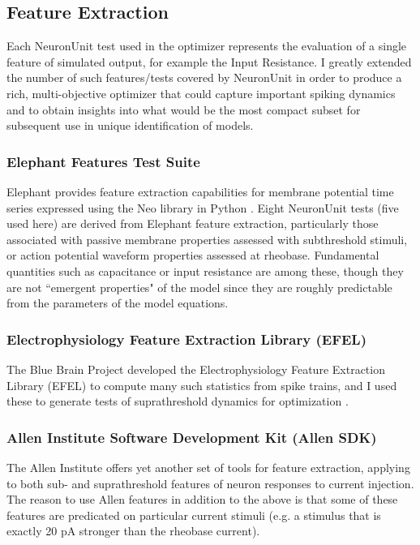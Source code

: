 \subsection{Feature Extraction}
Each NeuronUnit test used in the optimizer represents the evaluation of a single feature of simulated output, for example the Input Resistance.
I greatly extended the number of such features/tests covered by NeuronUnit in order to produce a rich, multi-objective optimizer that could capture important spiking dynamics and to obtain insights into what would be the most compact subset for subsequent use in unique identification of models.

\subsubsection{Elephant Features Test Suite}
\label{sec:elephant}
Elephant \citep{elephant18} provides feature extraction capabilities for membrane potential time series expressed using the Neo library in Python \citep{davison_neo}.
Eight NeuronUnit tests (five used here) are derived from Elephant feature extraction, particularly those associated with passive membrane properties assessed with subthreshold stimuli, or action potential waveform properties assessed at rheobase.
Fundamental quantities such as capacitance or input resistance are among these, though they are not ``emergent properties" of the model since they are roughly predictable from the parameters of the model equations.

\subsubsection{Electrophysiology Feature Extraction Library (EFEL)}
\label{sec:efel}
The Blue Brain Project developed the Electrophysiology Feature Extraction Library (EFEL) to compute many such statistics from spike trains, and I used these to generate tests of suprathreshold dynamics for optimization \citep{EFEL}.

\subsubsection{Allen Institute Software Development Kit (Allen SDK)}
\label{sec:allensdk}
The Allen Institute offers yet another set of tools for feature extraction, applying to both sub- and suprathreshold features of neuron responses to current injection.
The reason to use Allen features in addition to the above is that some of these features are predicated on particular current stimuli (e.g. a stimulus that is exactly 20 pA stronger than the rheobase current).

